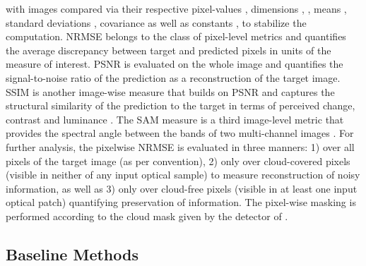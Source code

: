\documentclass[journal]{IEEEtran}
\begin{document}
 

\small 
\normalsize
with images  compared via their respective pixel-values , dimensions , , means , standard deviations , covariance   as well as constants  ,  to stabilize the computation. NRMSE belongs to the class of pixel-level metrics and quantifies the average discrepancy between target and predicted pixels in units of the measure of interest. PSNR is evaluated on the whole image and quantifies the signal-to-noise ratio of the prediction as a reconstruction of the target image. SSIM is another image-wise measure that builds on PSNR and captures the structural similarity of the prediction to the target in terms of perceived change, contrast and luminance \cite{Wang_Bovik_Sheikh_Simoncelli_2004}. The SAM measure is a third image-level metric that provides the spectral angle between the bands of two multi-channel images \cite{kruse1993spectral}. For further analysis, the pixelwise NRMSE is evaluated in three manners: 1) over all pixels of the target image (as per convention), 2) only over cloud-covered pixels (visible in neither of any input optical sample) to measure reconstruction of noisy information, as well as 3) only over cloud-free pixels (visible in at least one input optical patch) quantifying preservation of information. The pixel-wise masking is performed according to the cloud mask given by the detector of \cite{Zupanc}.

\subsection{Baseline Methods} \label{sub:baselines}
\end{document}
